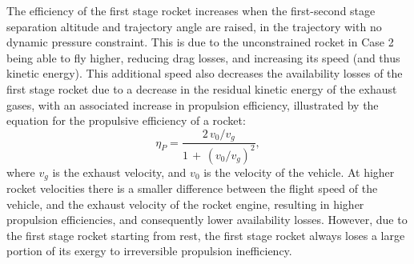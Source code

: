  The efficiency of the first stage rocket increases when the first-second stage separation altitude and trajectory angle are raised, in the trajectory with no dynamic pressure constraint. 
  This is due to the unconstrained rocket in Case 2 being able to fly higher, reducing drag losses, and increasing its speed (and thus kinetic energy). 
  This additional speed also decreases the availability losses of the first stage rocket due to a decrease in the residual kinetic energy of the exhaust gases, with an associated increase in propulsion efficiency, illustrated by the equation for the propulsive efficiency of a rocket\cite{RPE}:
 \begin{equation}\label{eq:rocketeff}
 \eta_P = \frac{2\,v_0/v_g}{1\,+\,(v_0/v_g)^2}, 
 \end{equation}
 where $v_g$ is the exhaust velocity, and $v_0$ is the velocity of the vehicle.
 At higher rocket velocities there is a smaller difference between the flight speed of the vehicle, and the exhaust velocity of the rocket engine, resulting in higher propulsion efficiencies, and consequently lower availability losses. 
 However, due to the first stage rocket starting from rest, the first stage rocket always loses a large portion of its exergy to irreversible propulsion inefficiency.  
 
